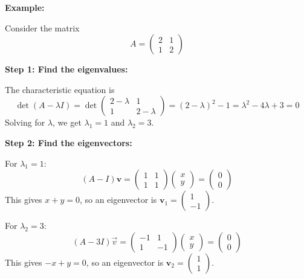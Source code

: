 \textbf{Example: }
\vspace{\baselineskip}

Consider the matrix
\[
A = \begin{pmatrix}
2 & 1 \\
1 & 2
\end{pmatrix}
\]

\textbf{Step 1: Find the eigenvalues:}

The characteristic equation is
    \[
    \det(A - \lambda I) = \det \begin{pmatrix}
    2 - \lambda & 1 \\
    1 & 2 - \lambda
    \end{pmatrix} = (2 - \lambda)^2 - 1 = \lambda^2 - 4\lambda + 3 = 0
    \]
    Solving for \(\lambda\), we get \(\lambda_1 = 1\) and \(\lambda_2 = 3\).

\textbf{Step 2: Find the eigenvectors:}

For \(\lambda_1 = 1\):
    \[
    (A - I)\mathbf{v} = \begin{pmatrix}
    1 & 1 \\
    1 & 1
    \end{pmatrix} \begin{pmatrix}
    x \\
    y
    \end{pmatrix} = \begin{pmatrix}
    0 \\
    0
    \end{pmatrix}
    \]
    This gives \(x + y = 0\), so an eigenvector is \(\mathbf{v}_1 = \begin{pmatrix} 1 \\ -1 \end{pmatrix}\).

    For \(\lambda_2 = 3\):
    \[
    (A - 3I)\vec{v} = \begin{pmatrix}
    -1 & 1 \\
    1 & -1
    \end{pmatrix} \begin{pmatrix}
    x \\
    y
    \end{pmatrix} = \begin{pmatrix}
    0 \\
    0
    \end{pmatrix}
    \]
    This gives \(-x + y = 0\), so an eigenvector is \(\mathbf{v}_2 = \begin{pmatrix} 1 \\ 1 \end{pmatrix}\).

